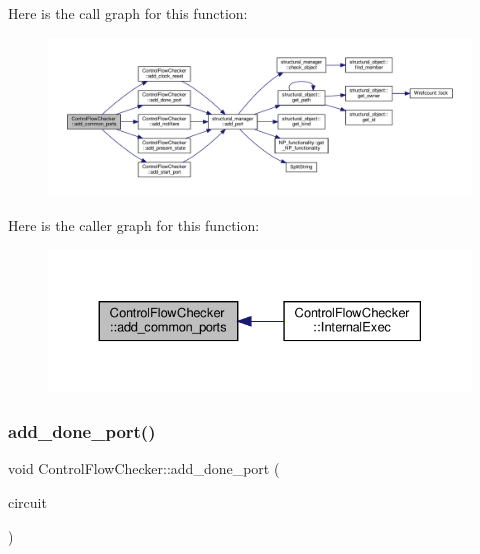Here is the call graph for this function\+:
\nopagebreak
\begin{figure}[H]
\begin{center}
\leavevmode
\includegraphics[width=350pt]{d0/dea/classControlFlowChecker_ab2feb53a8bf9a796c2d693083fd16944_cgraph}
\end{center}
\end{figure}
Here is the caller graph for this function\+:
\nopagebreak
\begin{figure}[H]
\begin{center}
\leavevmode
\includegraphics[width=330pt]{d0/dea/classControlFlowChecker_ab2feb53a8bf9a796c2d693083fd16944_icgraph}
\end{center}
\end{figure}
\mbox{\label{classControlFlowChecker_ac4b9c980db09ade524a0e72cd6d833d1}} 
\subsubsection{\texorpdfstring{add\+\_\+done\+\_\+port()}{add\_done\_port()}}
{\footnotesize\ttfamily void Control\+Flow\+Checker\+::add\+\_\+done\+\_\+port (\begin{DoxyParamCaption}\item[{\hyperlink{structural__objects_8hpp_a8ea5f8cc50ab8f4c31e2751074ff60b2}{structural\+\_\+object\+Ref}}]{circuit }\end{DoxyParamCaption})\hspace{0.3cm}{\ttfamily [protected]}}

